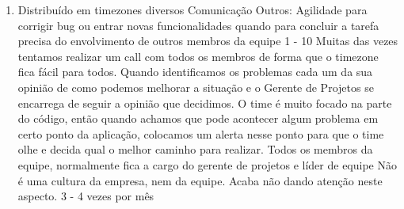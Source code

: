 \begin{enumerate}[leftmargin=0.5em]
	\item
	\begin{respostas3}
		{Distribuído em timezones diversos}
		{Comunicação \newline Outros: Agilidade para corrigir bug ou entrar novas funcionalidades quando para concluir a tarefa precisa do envolvimento de outros membros da equipe}
		{1 - 10}
		{Muitas das vezes tentamos realizar um call com todos os membros de forma que o timezone fica fácil para todos. Quando identificamos os problemas cada um da sua opinião de como podemos melhorar a situação e o Gerente de Projetos se encarrega de seguir a opinião que decidimos.}
		{O time é muito focado na parte do código, então quando achamos que pode acontecer algum problema em certo ponto da aplicação, colocamos um alerta nesse ponto para que o time olhe e decida qual o melhor caminho para realizar.}
		{Todos os membros da equipe, normalmente fica a cargo do gerente de projetos e líder de equipe}
		{Não é uma cultura da empresa, nem da equipe. Acaba não dando atenção neste aspecto.}
		{3 - 4 vezes por mês}
	\end{respostas3}
\end{enumerate}